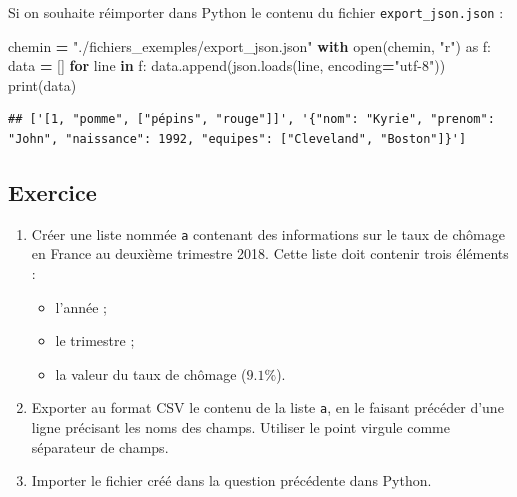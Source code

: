 \documentclass[12pt,]{book}
\newenvironment{Shaded}{\begin{snugshade}}{\end{snugshade}}
\newcommand{\KeywordTok}[1]{\textcolor[rgb]{0.13,0.29,0.53}{\textbf{#1}}}
\newcommand{\StringTok}[1]{\textcolor[rgb]{0.31,0.60,0.02}{#1}}
\newcommand{\ImportTok}[1]{#1}
\newcommand{\ControlFlowTok}[1]{\textcolor[rgb]{0.13,0.29,0.53}{\textbf{#1}}}
\newcommand{\OperatorTok}[1]{\textcolor[rgb]{0.81,0.36,0.00}{\textbf{#1}}}
\newcommand{\BuiltInTok}[1]{#1}
\newcommand{\NormalTok}[1]{#1}
\providecommand{\tightlist}{%
  \setlength{\itemsep}{0pt}\setlength{\parskip}{0pt}}
\numberwithin{equation}{section}
\numberwithin{countremarque}{section}
\let\BeginKnitrBlock\begin \let\EndKnitrBlock\end
\begin{document}
Si on souhaite réimporter dans Python le contenu du fichier
\texttt{export\_json.json} :

\begin{Shaded}
\begin{Highlighting}[]
\NormalTok{chemin }\OperatorTok{=} \StringTok{"./fichiers_exemples/export_json.json"}
\ControlFlowTok{with} \BuiltInTok{open}\NormalTok{(chemin, }\StringTok{"r"}\NormalTok{) }\ImportTok{as}\NormalTok{ f:}
\NormalTok{    data }\OperatorTok{=}\NormalTok{ []}
    \ControlFlowTok{for}\NormalTok{ line }\KeywordTok{in}\NormalTok{ f:}
\NormalTok{        data.append(json.loads(line, encoding}\OperatorTok{=}\StringTok{"utf-8"}\NormalTok{))}
\BuiltInTok{print}\NormalTok{(data)}
\end{Highlighting}
\end{Shaded}

\begin{lstlisting}
## ['[1, "pomme", ["pépins", "rouge"]]', '{"nom": "Kyrie", "prenom": "John", "naissance": 1992, "equipes": ["Cleveland", "Boston"]}']
\end{lstlisting}

\subsection{Exercice}\label{exercice-3}

\BeginKnitrBlock{exframe}
\begin{enumerate}
\def\labelenumi{\arabic{enumi}.}
\tightlist
\item
  Créer une liste nommée \texttt{a} contenant des informations sur le
  taux de chômage en France au deuxième trimestre 2018. Cette liste doit
  contenir trois éléments :

  \begin{itemize}
  \tightlist
  \item
    l'année ;
  \item
    le trimestre ;
  \item
    la valeur du taux de chômage (\(9.1\%\)).
  \end{itemize}
\item
  Exporter au format CSV le contenu de la liste \texttt{a}, en le
  faisant précéder d'une ligne précisant les noms des champs. Utiliser
  le point virgule comme séparateur de champs.
\item
  Importer le fichier créé dans la question précédente dans Python.
\end{enumerate}
\EndKnitrBlock{exframe}
\end{document}
